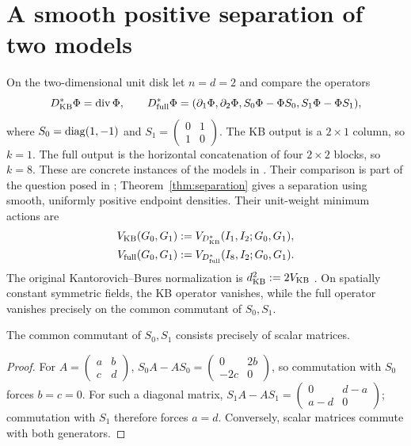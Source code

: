 \section{A smooth positive separation of two models}\label{sec:separation}
On the two-dimensional unit disk let $n=d=2$ and compare the operators
\[
 D^*_{\rm KB}\Phi=\operatorname{div}\Phi,\qquad
 D^*_{\rm full}\Phi=(\partial_1\Phi,\partial_2\Phi,
                         S_0\Phi-\Phi S_0,S_1\Phi-\Phi S_1),
\]
where $S_0=\operatorname{diag}(1,-1)$ and
$S_1=\begin{pmatrix}0&1\\1&0\end{pmatrix}$.
The KB output is a $2\times1$ column, so $k=1$. The full output is the
horizontal concatenation of four $2\times2$ blocks, so $k=8$.
These are concrete instances of the models in \cite[Examples 7.1 and 7.3]{LiZou}.
Their comparison is part of the question posed in
\cite[Remark 7.1]{LiZou}; Theorem~\ref{thm:separation} gives a separation
using smooth, uniformly positive endpoint densities.
Their unit-weight minimum actions are
\[
 \begin{aligned}
 V_{\rm KB}(G_0,G_1)&:=V_{D^*_{\rm KB}}(I_1,I_2;G_0,G_1),\\
 V_{\rm full}(G_0,G_1)&:=V_{D^*_{\rm full}}(I_8,I_2;G_0,G_1).
 \end{aligned}
\]
The original Kantorovich--Bures normalization is
$d_{\rm KB}^2:=2V_{\rm KB}$
\cite[Definition 2.1 and equation (2.3)]{BrenierVorotnikov}.
On spatially constant symmetric fields, the KB operator vanishes, while
the full operator vanishes precisely on the common commutant of $S_0,S_1$.

\begin{lemma}\label{lem:generators}
The common commutant of $S_0,S_1$ consists precisely of scalar matrices.
\end{lemma}
\begin{proof}
For $A=\left(\begin{smallmatrix}a&b\\c&d\end{smallmatrix}\right)$,
$S_0A-AS_0=\left(\begin{smallmatrix}0&2b\\-2c&0\end{smallmatrix}\right)$,
so commutation with $S_0$ forces $b=c=0$. For such a diagonal matrix,
$S_1A-AS_1=\left(\begin{smallmatrix}0&d-a\\a-d&0\end{smallmatrix}\right)$;
commutation with $S_1$ therefore forces $a=d$. Conversely, scalar matrices
commute with both generators.
\end{proof}


